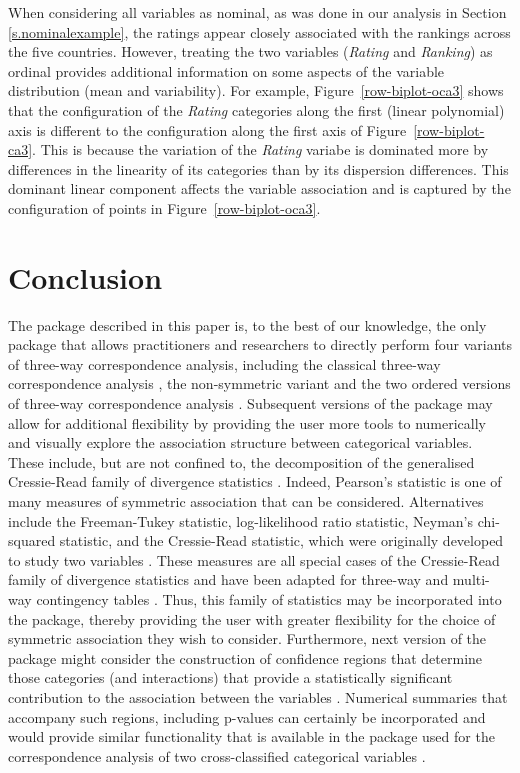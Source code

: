 When considering all variables as nominal, as was done in our analysis in Section \ref{s.nominalexample}, the ratings appear closely associated with the  rankings  across the five countries. However, treating the two variables ({\it Rating} and {\it Ranking}) as ordinal  provides additional information on some aspects of the variable distribution (mean and variability). 
For example, Figure~\ref{row-biplot-oca3}  shows that the configuration of the {\it Rating} categories along the first (linear polynomial) axis is different to the configuration along the first axis of  Figure~\ref{row-biplot-ca3}. This is because the variation of the {\it Rating} variabe is dominated more by differences in the linearity of its categories than by its dispersion differences.  This dominant linear component affects the variable association and is captured by the configuration of points in Figure~\ref{row-biplot-oca3}.

\section{Conclusion}
\label{s.7}
The  package described in this paper is, to the best of our knowledge, the only package that allows practitioners and researchers to directly perform  four variants of three-way correspondence analysis, including the classical three-way correspondence analysis \cite[]{carkro96},  the non-symmetric variant and the two ordered versions of three-way correspondence analysis \cite[]{lombehkro21}. 
Subsequent versions of the package may allow for additional flexibility by providing the user more tools to numerically and visually explore the association structure between categorical variables. These include, but are not confined to, the  decomposition
of the generalised Cressie-Read family of divergence statistics \citep{par96}.
Indeed, Pearson's statistic is one of many measures of symmetric association that can be considered. Alternatives include the Freeman-Tukey statistic, log-likelihood ratio statistic, Neyman's chi-squared statistic, and the Cressie-Read statistic, which were originally developed to study two variables  \citep{cre84,behlom23}. These measures are all special cases of the Cressie-Read family of divergence statistics and have been adapted for three-way and multi-way contingency tables \citep{par96,par03,lombeh22}. 
Thus, this family of statistics may be incorporated into the  package, thereby providing the user with greater flexibility for the choice of symmetric association they wish to consider.
Furthermore, next version of the package might consider  the construction of confidence regions that determine those categories (and interactions) that provide a statistically significant contribution to the association between the variables \citep{beh10, rin96, rin12}. Numerical summaries that accompany such regions, including p-values \citep{behlom15} can certainly be incorporated and would provide similar functionality that is available in the  package used for the correspondence analysis of two cross-classified categorical variables \citep{behlom16}. 

